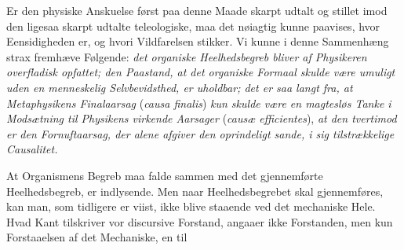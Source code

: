 \documentclass[12pt,a4paper]{book}
\begin{document}
Er den physiske Anskuelse først paa denne Maade skarpt udtalt og stillet imod
den ligesaa skarpt udtalte teleologiske, maa det nøiagtig kunne paavises, hvor
Eensidigheden er, og hvori Vildfarelsen stikker. Vi kunne i denne Sammenhæng
strax fremhæve Følgende: \emph{det organiske Heelhedsbegreb bliver af
Physikeren overfladisk opfattet; den Paastand, at det organiske Formaal skulde
være umuligt uden en menneskelig Selvbevidsthed, er uholdbar; det er saa langt
fra, at Metaphysikens Finalaarsag} (\textit{causa finalis}) \emph{kun skulde
være en magtesløs Tanke i Modsætning til Physikens virkende Aarsager}
(\textit{causæ efficientes}), \emph{at den tvertimod er den Fornuftaarsag, der
alene afgiver den oprindeligt sande, i sig tilstrækkelige Causalitet.}

At Organismens Begreb maa falde sammen med det gjennemførte Heelhedsbegreb, er
indlysende. Men naar Heelhedsbegrebet skal gjennemføres, kan man, som tidligere
er viist, ikke blive staaende ved det mechaniske Hele. Hvad Kant tilskriver vor
discursive Forstand, angaaer ikke Forstanden, men kun Forstaaelsen af det
Mechaniske, en til
\end{document}
